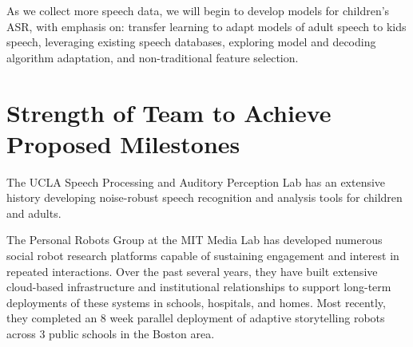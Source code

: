 As we collect more speech data, we will begin to develop models for children's ASR, with emphasis on: transfer learning to adapt models of adult speech to kids speech, leveraging existing speech databases, exploring model and decoding algorithm adaptation, and non-traditional feature selection.



\vspace{-4mm}   
\section{Strength of Team to Achieve Proposed Milestones}
\vspace{-3mm}
The UCLA Speech Processing and Auditory Perception Lab has an extensive history developing noise-robust speech recognition and analysis tools for children and adults.  


The Personal Robots Group at the MIT Media Lab has developed numerous social robot research platforms capable of sustaining engagement and interest in repeated interactions. Over the past several years, they have built extensive cloud-based infrastructure and institutional relationships to support long-term deployments of these systems in schools, hospitals, and homes. Most recently, they completed an 8 week parallel deployment of adaptive storytelling robots across 3 public schools in the Boston area.


